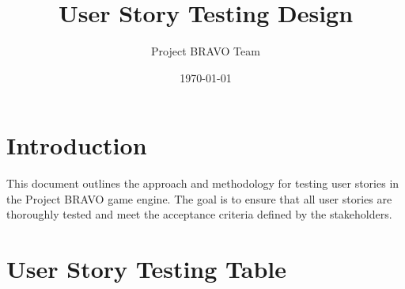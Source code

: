 \documentclass{article}
\title{User Story Testing Design}
\author{Project BRAVO Team}
\date{\today}
\begin{document}
\maketitle

\section{Introduction}
This document outlines the approach and methodology for testing user stories in the Project BRAVO game engine. The goal is to ensure that all user stories are thoroughly tested and meet the acceptance criteria defined by the stakeholders.

\section{User Story Testing Table}
\end{document}
